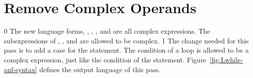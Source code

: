 \documentclass[7x10]{TimesAPriori_MIT}%
\def\racketEd{0}
\def\pythonEd{1}
\def\edition{0}
\numberwithin{theorem}{chapter}
\numberwithin{definition}{chapter}
\numberwithin{equation}{chapter}
\begin{document}
\section{Remove Complex Operands}
\label{sec:rco-loop}

{\if\edition\racketEd
%
The new language forms, , , , and
 are all complex expressions. The subexpressions of
, , and  are allowed to be complex.
%
\fi}
{\if\edition\pythonEd
%
The change needed for this pass is to add a case for the 
statement. The condition of a  loop is allowed to be a
complex expression, just like the condition of the 
statement.
%
\fi}  
%
Figure~\ref{fig:Lwhile-anf-syntax} defines the output language
\LangLoopANF{} of this pass.

\newcommand{\LwhileMonadASTRacket}{
\begin{array}{rcl}
\Atm &::=& \VOID{} \\
\Exp &::=& \GETBANG{\Var}
      \MID \SETBANG{\Var}{\Exp} 
      \MID \BEGIN{\LP\Exp\ldots\RP}{\Exp} \\
      &\MID& \WHILE{\Exp}{\Exp}
\end{array}
}

\newcommand{\LwhileMonadASTPython}{
\begin{array}{rcl}
\Stmt{} &::=& \WHILESTMT{\Exp}{\Stmt^{+}} 
\end{array}
}
\end{document}
